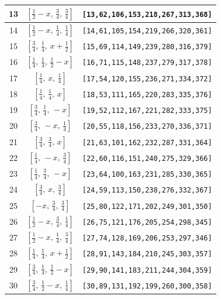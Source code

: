 \documentclass[fleqn,8pt]{jsarticle}
\begin{document}
\begin{longtable}{ccc}
13 & $\left[ \frac{1}{2} - x,\, \frac{3}{4},\, \frac{3}{4} \right]$ & {\tt [13,62,106,153,218,267,313,368]} \\ \hline
14 & $\left[ \frac{1}{2} - x,\, \frac{1}{4},\, \frac{1}{4} \right]$ & {\tt [14,61,105,154,219,266,320,361]} \\ \hline
15 & $\left[ \frac{3}{4},\, \frac{1}{4},\, x + \frac{1}{2} \right]$ & {\tt [15,69,114,149,239,280,316,379]} \\ \hline
16 & $\left[ \frac{1}{4},\, \frac{1}{4},\, \frac{1}{2} - x \right]$ & {\tt [16,71,115,148,237,279,317,378]} \\ \hline
17 & $\left[ \frac{1}{4},\, x,\, \frac{1}{4} \right]$ & {\tt [17,54,120,155,236,271,334,372]} \\ \hline
18 & $\left[ \frac{1}{4},\, \frac{1}{4},\, x \right]$ & {\tt [18,53,111,165,220,283,335,376]} \\ \hline
19 & $\left[ \frac{3}{4},\, \frac{1}{4},\, - x \right]$ & {\tt [19,52,112,167,221,282,333,375]} \\ \hline
20 & $\left[ \frac{3}{4},\, - x,\, \frac{1}{4} \right]$ & {\tt [20,55,118,156,233,270,336,371]} \\ \hline
21 & $\left[ \frac{3}{4},\, \frac{3}{4},\, x \right]$ & {\tt [21,63,101,162,232,287,331,364]} \\ \hline
22 & $\left[ \frac{1}{4},\, - x,\, \frac{3}{4} \right]$ & {\tt [22,60,116,151,240,275,329,366]} \\ \hline
23 & $\left[ \frac{1}{4},\, \frac{3}{4},\, - x \right]$ & {\tt [23,64,100,163,231,285,330,365]} \\ \hline
24 & $\left[ \frac{3}{4},\, x,\, \frac{3}{4} \right]$ & {\tt [24,59,113,150,238,276,332,367]} \\ \hline
25 & $\left[ - x,\, \frac{3}{4},\, \frac{3}{4} \right]$ & {\tt [25,80,122,171,202,249,301,350]} \\ \hline
26 & $\left[ \frac{1}{2} - x,\, \frac{3}{4},\, \frac{1}{4} \right]$ & {\tt [26,75,121,176,205,254,298,345]} \\ \hline
27 & $\left[ \frac{1}{2} - x,\, \frac{1}{4},\, \frac{3}{4} \right]$ & {\tt [27,74,128,169,206,253,297,346]} \\ \hline
28 & $\left[ \frac{1}{4},\, \frac{1}{4},\, x + \frac{1}{2} \right]$ & {\tt [28,91,143,184,210,245,303,357]} \\ \hline
29 & $\left[ \frac{3}{4},\, \frac{1}{4},\, \frac{1}{2} - x \right]$ & {\tt [29,90,141,183,211,244,304,359]} \\ \hline
30 & $\left[ \frac{3}{4},\, \frac{1}{2} - x,\, \frac{1}{4} \right]$ & {\tt [30,89,131,192,199,260,300,358]} \\ \hline

\end{longtable}
\end{document}
